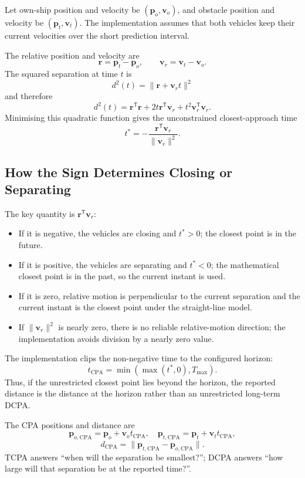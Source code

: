 \documentclass[11pt,a4paper]{article}
\begin{document}
Let own-ship position and velocity be \((\bm{p}_o,\bm{v}_o)\), and obstacle position and velocity be \((\bm{p}_t,\bm{v}_t)\). The implementation assumes that both vehicles keep their current velocities over the short prediction interval.

The relative position and velocity are
\[
\bm{r}=\bm{p}_t-\bm{p}_o,\qquad \bm{v}_r=\bm{v}_t-\bm{v}_o.
\]
The squared separation at time \(t\) is
\[
d^2(t)=\|\bm{r}+\bm{v}_r t\|^2
\]
and therefore
\[
d^2(t)=\bm{r}^{\mathsf T}\bm{r}+2t\bm{r}^{\mathsf T}\bm{v}_r+t^2\bm{v}_r^{\mathsf T}\bm{v}_r.
\]
Minimising this quadratic function gives the unconstrained closest-approach time
\[
t^*=-\frac{\bm{r}^{\mathsf T}\bm{v}_r}{\|\bm{v}_r\|^2}.
\]

\subsection{How the Sign Determines Closing or Separating}
The key quantity is \(\bm{r}^{\mathsf T}\bm{v}_r\):
\begin{itemize}
  \item If it is negative, the vehicles are closing and \(t^*>0\); the closest point is in the future.
  \item If it is positive, the vehicles are separating and \(t^*<0\); the mathematical closest point is in the past, so the current instant is used.
  \item If it is zero, relative motion is perpendicular to the current separation and the current instant is the closest point under the straight-line model.
  \item If \(\|\bm{v}_r\|^2\) is nearly zero, there is no reliable relative-motion direction; the implementation avoids division by a nearly zero value.
\end{itemize}

The implementation clips the non-negative time to the configured horizon:
\[
t_{\mathrm{CPA}}=\min\left(\max(t^*,0),T_{\max}\right).
\]
Thus, if the unrestricted closest point lies beyond the horizon, the reported distance is the distance at the horizon rather than an unrestricted long-term DCPA.

The CPA positions and distance are
\[
\bm{p}_{o,\mathrm{CPA}}=\bm{p}_o+\bm{v}_o t_{\mathrm{CPA}},
\quad
\bm{p}_{t,\mathrm{CPA}}=\bm{p}_t+\bm{v}_t t_{\mathrm{CPA}},
\]
\[
d_{\mathrm{CPA}}=\|\bm{p}_{t,\mathrm{CPA}}-\bm{p}_{o,\mathrm{CPA}}\|.
\]
TCPA answers ``when will the separation be smallest?''; DCPA answers ``how large will that separation be at the reported time?''.
\end{document}
